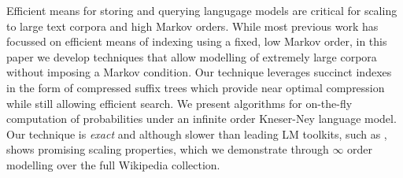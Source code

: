 Efficient means for storing and querying langugage models are critical for scaling  to large text corpora and high Markov orders.
While most previous work has focussed on efficient means of indexing \ngrams using a fixed, low Markov order,
in this paper we develop techniques that allow modelling of extremely large corpora without imposing a Markov condition.
Our technique leverages succinct indexes in the form of compressed suffix trees which provide near optimal compression while still allowing efficient search.
We present algorithms for on-the-fly computation of probabilities under an infinite order Kneser-Ney language model.
Our technique is \emph{exact} and although slower than leading LM toolkits, such as \SRILM, shows promising scaling properties, which we demonstrate through $\infty$ order modelling over the full Wikipedia collection. 

%
%
%
%

